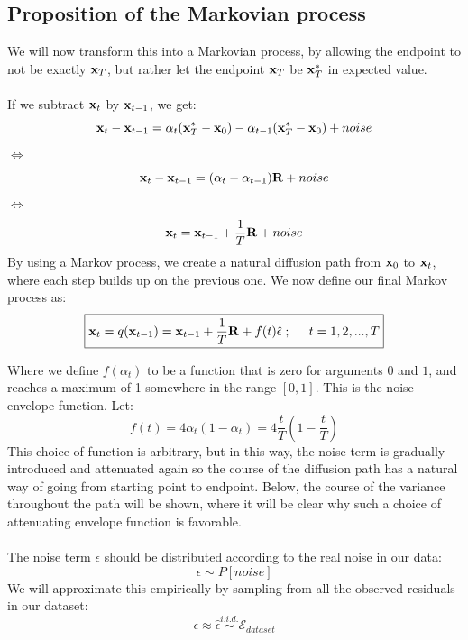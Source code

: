 \documentclass[twocolumn]{article}
\begin{document}
\begin{appendices}
\subsection{Proposition of the Markovian process}
We will now transform this into a Markovian process, by allowing the endpoint to not be exactly $\bold{x}_T$, but rather let the endpoint $\bold{x}_T$ be $\bold{x}_T^*$ in expected value.\\
\\
If we subtract $\bold{x}_t$ by $\bold{x}_{t-1}$, we get:
\begin{equation}
    \bold{x}_t - \bold{x}_{t-1} = \alpha_t (\bold{x}_T^* - \bold{x}_0) - \alpha_{t-1} (\bold{x}_T^* - \bold{x}_0) + noise
\end{equation}
$\Leftrightarrow$
\begin{equation}
    \bold{x}_t - \bold{x}_{t-1} = (\alpha_t - \alpha_{t-1}) \bold{R} + noise
\end{equation}
$\Leftrightarrow$
\begin{equation}
    \bold{x}_t = \bold{x}_{t-1} + \frac{1}{T} \bold{R} + noise
\end{equation}
By using a Markov process, we create a natural diffusion path from $\bold{x}_0$ to $\bold{x}_t$, where each step builds up on the previous one. 
We now define our final Markov process as: 
\begin{equation}\label{eq:12}
    \boxed{\bold{x}_t = q(\bold{x}_{t-1}) = \bold{x}_{t-1} + \frac{1}{T} \bold{R} + f(t) \hat{\epsilon} \hspace{.1cm};\hspace{.5cm} t=1,2,...,T}
\end{equation}

Where we define $f(\alpha_t)$ to be a function that is zero for arguments $0$ and $1$, and reaches a maximum of 1 somewhere in the range $[0,1]$. This is the noise envelope function. Let:
\begin{equation}\label{eq:13}
    f(t) = 4\alpha_t(1-\alpha_t) = 4 \frac{t}{T} (1-\frac{t}{T})
\end{equation}
This choice of function is arbitrary, but in this way, the noise term is gradually introduced and attenuated again so the course of the diffusion path has a natural way of going from starting point to endpoint. Below, the course of the variance throughout the path will be shown, where it will be clear why such a choice of attenuating envelope function is favorable. \\
\\
The noise term $\epsilon$ should be distributed according to the real noise in our data:
\begin{equation}
    \epsilon \sim P[noise]
\end{equation}
We will approximate this empirically by sampling from all the observed residuals in our dataset:
\begin{equation}
    \epsilon \approx \hat{\epsilon} \stackrel{i.i.d.}{\sim} \mathcal{E}_{dataset}
\end{equation}


\end{appendices}
\end{document}
